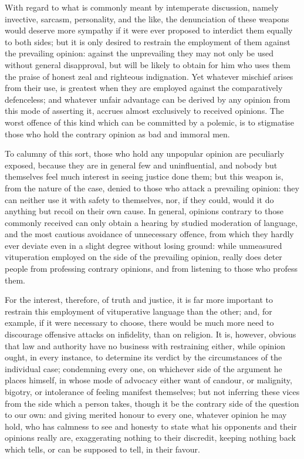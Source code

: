 With regard to what is commonly meant by intemperate discussion, namely invective, sarcasm, personality, and the like, the denunciation of these weapons would deserve more sympathy if it were ever proposed to interdict them equally to both sides; but it is only desired to restrain the employment of them against the prevailing opinion: against the unprevailing they may not only be used without general disapproval, but will be likely to obtain for him who uses them the praise of honest zeal and righteous indignation. Yet whatever mischief arises from their use, is greatest when they are employed against the comparatively defenceless; and whatever unfair advantage can be derived by any opinion from this mode of asserting it, accrues almost exclusively to received opinions. The worst offence of this kind which can be committed by a polemic, is to stigmatise those who hold the contrary opinion as bad and immoral men.\par

To calumny of this sort, those who hold any unpopular opinion are peculiarly exposed, because they are in general few and uninfluential, and nobody but themselves feel much interest in seeing justice done them; but this weapon is, from the nature of the case, denied to those who attack a prevailing opinion: they can neither use it with safety to themselves, nor, if they could, would it do anything but recoil on their own cause. In general, opinions contrary to those commonly received can only obtain a hearing by studied moderation of language, and the most cautious avoidance of unnecessary offence, from which they hardly ever deviate even in a slight degree without losing ground: while unmeasured vituperation employed on the side of the prevailing opinion, really does deter people from professing contrary opinions, and from listening to those who profess them.\par

For the interest, therefore, of truth and justice, it is far more important to restrain this employment of vituperative language than the other; and, for example, if it were necessary to choose, there would be much more need to discourage offensive attacks on infidelity, than on religion. It is, however, obvious that law and authority have no business with restraining either, while opinion ought, in every instance, to determine its verdict by the circumstances of the individual case; condemning every one, on whichever side of the argument he places himself, in whose mode of advocacy either want of candour, or malignity, bigotry, or intolerance of feeling manifest themselves; but not inferring these vices from the side which a person takes, though it be the contrary side of the question to our own: and giving merited honour to every one, whatever opinion he may hold, who has calmness to see and honesty to state what his opponents and their opinions really are, exaggerating nothing to their discredit, keeping nothing back which tells, or can be supposed to tell, in their favour.\par

